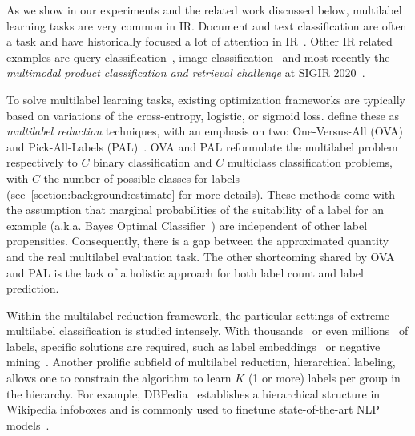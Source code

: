 As we show in our experiments and the related work discussed below, multilabel learning tasks are very common in \ac{IR}. Document and text classification are often a  task and have historically focused a lot of attention in \ac{IR}~\cite{IRClassStat, textCategorization, statTextCategorization, documentClassification}. Other \ac{IR} related examples are query classification~\cite{queryClassification, introIR}, image classification~\cite{imageClassification, faceDetection} and most recently the \textit{multimodal product classification and retrieval challenge} at SIGIR 2020~\cite{Amoualian2020SIGIR2E}. 
\fi

To solve multilabel learning tasks, existing optimization frameworks are typically based on variations of the cross-entropy, logistic, or sigmoid loss. \citeauthor{multilabelReduction} define these as \emph{multilabel reduction} techniques, with an emphasis on two: One-Versus-All (OVA) and Pick-All-Labels (PAL)~\cite{multilabelReduction}. OVA and PAL reformulate the multilabel problem respectively to $C$ binary classification and $C$ multiclass classification problems, with $C$ the number of possible classes for labels (see~\ref{section:background:estimate} for more details). These methods come with the assumption that marginal probabilities of the suitability of a label for an example (a.k.a. Bayes Optimal Classifier~\cite{OVA2}) are independent of other label propensities. Consequently, there is a gap between the approximated quantity and the real multilabel evaluation task. The other shortcoming shared by OVA and PAL is the lack of a holistic approach for both label count and label prediction.

Within the multilabel reduction framework, the particular settings of extreme multilabel classification is studied intensely. With thousands~\cite{extremeClassification} or even millions~\cite{millionsOfLabels, extremeMilliionsSlice} of labels, specific solutions are required, such as label embeddings~\cite{extremeMultilabelEmbeddings} or negative mining~\cite{stochasticNegativeMining}. Another prolific subfield of multilabel reduction, hierarchical labeling, allows one to constrain the algorithm to learn $K$ (1 or more) labels per group in the hierarchy. For example, DBPedia~\citep{lehmann2015dbpedia} establishes a hierarchical structure in Wikipedia infoboxes and is commonly used to finetune state-of-the-art NLP models~\citep[see, e.g.,][]{XLNet, ULMFit}. 

